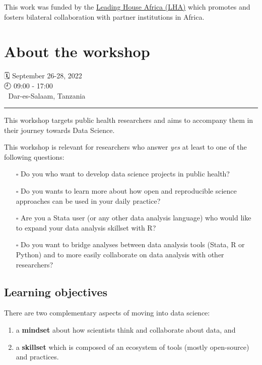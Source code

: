\documentclass[
  letterpaper,
  DIV=11,
  numbers=noendperiod]{scrreprt}
\providecommand{\tightlist}{%
  \setlength{\itemsep}{0pt}\setlength{\parskip}{0pt}}\usepackage{longtable,booktabs,array}
\begin{document}
This work was funded by the
\href{https://www.swisstph.ch/en/research/leading-house-africa/}{Leading
House Africa (LHA)} which promotes and fosters bilateral collaboration
with partner institutions in Africa.


\hypertarget{about-the-workshop}{%
\chapter{About the workshop}\label{about-the-workshop}}

{🗓️} September 26-28, 2022\\
{🕘} 09:00 - 17:00\\
{🌇} Dar-es-Salaam, Tanzania

\begin{center}\rule{0.5\linewidth}{0.5pt}\end{center}

This workshop targets public health researchers and aims to accompany
them in their journey towards Data Science.

This workshop is relevant for researchers who answer \emph{yes} at least
to one of the following questions:

\begin{itemize}
\tightlist
\item[$\square$]
  Do you who want to develop data science projects in public health?
\item[$\square$]
  Do you wants to learn more about how open and reproducible science
  approaches can be used in your daily practice?
\item[$\square$]
  Are you a Stata user (or any other data analysis language) who would
  like to expand your data analysis skillset with R?
\item[$\square$]
  Do you want to bridge analyses between data analysis tools (Stata, R
  or Python) and to more easily collaborate on data analysis with other
  researchers?
\end{itemize}

\hypertarget{learning-objectives}{%
\section{Learning objectives}\label{learning-objectives}}

There are two complementary aspects of moving into data science:

\begin{enumerate}
\def\labelenumi{\arabic{enumi}.}
\tightlist
\item
  a \textbf{mindset} about how scientists think and collaborate about
  data, and
\item
  a \textbf{skillset} which is composed of an ecosystem of tools (mostly
  open-source) and practices.
\end{enumerate}
\end{document}
